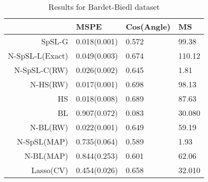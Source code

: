 \begin{table}[ht]
\centering
\begin{tabular}{rlll}
  \hline
 & MSPE & Cos(Angle) & MS \\ 
  \hline
SpSL-G & 0.018(0.001) & 0.572 & 99.38 \\ 
  N-SpSL-L(Exact) & 0.049(0.003) & 0.674 & 110.12 \\ 
  N-SpSL-C(RW) & 0.026(0.002) & 0.645 & 1.81 \\ 
  N-HS(RW) & 0.017(0.001) & 0.698 & 98.13 \\ 
HS & 0.018(0.008) & 0.689 & 87.63\\
BL &     0.907(0.072)&     0.083&    30.080\\
  N-BL(RW) & 0.022(0.001) & 0.649 & 59.19 \\ 
  N-SpSL(MAP) & 0.735(0.064) & 0.589 & 1.93 \\ 
  N-BL(MAP) & 0.844(0.253) & 0.601 & 62.06 \\
  Lasso(CV) &     0.454(0.026)&     0.658&    32.010\\
   \hline
\end{tabular}
\caption{Results for Bardet-Biedl dataset} 
\label{table:bardet}
\end{table}
